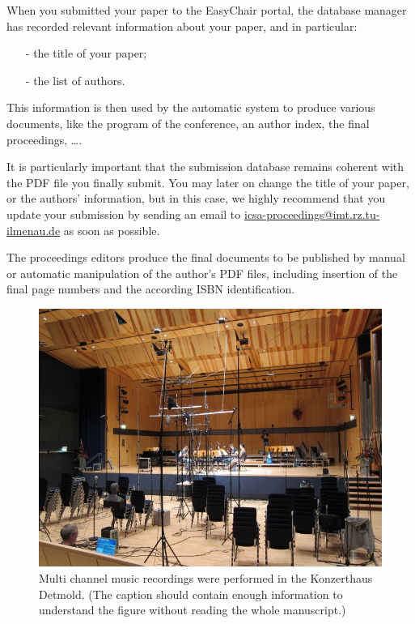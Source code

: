 \documentclass[a4paper, 10pt, twocolumn]{article}
\begin{document}
When you submitted your paper to the EasyChair portal, the database manager has recorded relevant information about your paper, and in particular:
\begin{itemize}
	\item[-] the title of your paper;
	\item[-] the list of authors.
\end{itemize}
This information is then used by the automatic system to produce various documents, like the program of the conference, an author index, the final proceedings, \ldots.

It is particularly important that the submission database remains coherent with the PDF file you finally submit. You may later on change the title of your paper, or the authors' information, but in this case, we highly recommend that you update your submission by sending an email to \textcolor{blue}{\url{icsa-proceedings@imt.rz.tu-ilmenau.de}} as soon as possible.

The proceedings editors produce the final documents to be published by manual or automatic manipulation of the author's PDF files, including insertion of the final page numbers and the according ISBN identification.



\begin{figure}[hbt]
	\begin{center}
		\includegraphics[width=\columnwidth]{figures/figure1.jpeg}
	\end{center}
	\caption{Multi channel music recordings were performed in the Konzerthaus Detmold. (The caption should contain enough information to understand the figure without reading the whole manuscript.)\label{fig:dode}}
\end{figure}
\end{document}
